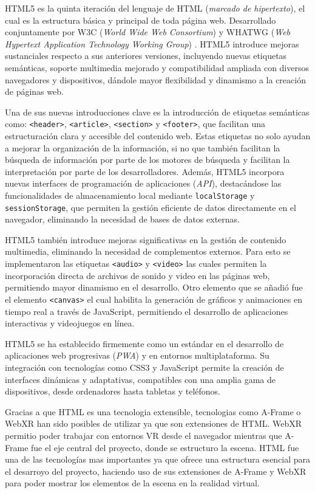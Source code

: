 \documentclass[a4paper, 12pt]{book}
\begin{document}
HTML5 \cite{freeman2018head} es la quinta iteración del lenguaje de HTML (\textit{marcado de hipertexto}), el cual es la estructura básica y principal de toda página web.
Desarrollado conjuntamente por W3C (\textit{World Wide Web Consortium}) \cite{w3c_mission} y WHATWG (\textit{Web Hypertext Application Technology Working Group}) \cite{whatwg}.
HTML5 introduce mejoras sustanciales respecto a sus anteriores versiones, incluyendo nuevas etiquetas semánticas, soporte multimedia mejorado y compatibilidad
ampliada con diversos navegadores y dispositivos, dándole mayor flexibilidad y dinamismo a la creación de páginas web.

Una de sus nuevas introducciones clave es la introducción de etiquetas semánticas como: \texttt{<header>}, \texttt{<article>}, \texttt{<section>} y \texttt{<footer>},
que facilitan una estructuración clara y accesible del contenido web. Estas etiquetas no solo ayudan a mejorar la organización de la información, si no que también facilitan la búsqueda
de información por parte de los motores de búsqueda y facilitan la interpretación por parte de los desarrolladores.
Además, HTML5 incorpora nuevas interfaces de programación de aplicaciones (\textit{API}), destacándose las funcionalidades de almacenamiento local mediante
\texttt{localStorage} y \texttt{sessionStorage}, que permiten la gestión eficiente de datos directamente en el navegador, eliminando la necesidad de bases de datos externas.

HTML5 también introduce mejoras significativas en la gestión de contenido multimedia, eliminando la necesidad de complementos externos. Para esto se implementaron
las etiquetas \texttt{<audio>} y \texttt{<video>} las cuales permiten la incorporación directa de archivos de sonido y video en las páginas web, permitiendo mayor dinamismo en el desarrollo.
Otro elemento que se añadió fue el elemento \texttt{<canvas>} el cual habilita la generación de gráficos y animaciones en tiempo real a través de JavaScript, permitiendo el desarrollo de aplicaciones interactivas y videojuegos en línea.

HTML5 se ha establecido firmemente como un estándar en el desarrollo de aplicaciones web progresivas (\textit{PWA}) y en entornos multiplataforma. Su integración con tecnologías como CSS3 y JavaScript
permite la creación de interfaces dinámicas y adaptativas, compatibles con una amplia gama de dispositivos, desde ordenadores hasta tabletas y teléfonos.

Gracias a que HTML es una tecnologia extensible, tecnologias como A-Frame o WebXR han sido posibles de utilizar ya que son extensiones de HTML. WebXR permitio poder trabajar con entornos VR desde el navegador mientras que A-Frame fue el eje central 
del proyecto, donde se estructuro la escena. HTML fue una de las tecnologías mas importantes ya que ofrece una estructura esencial para el desarroyo del proyecto, haciendo uso de sus extensiones de A-Frame y WebXR para poder mostrar los elementos de la escena en la realidad virtual.
\end{document}
